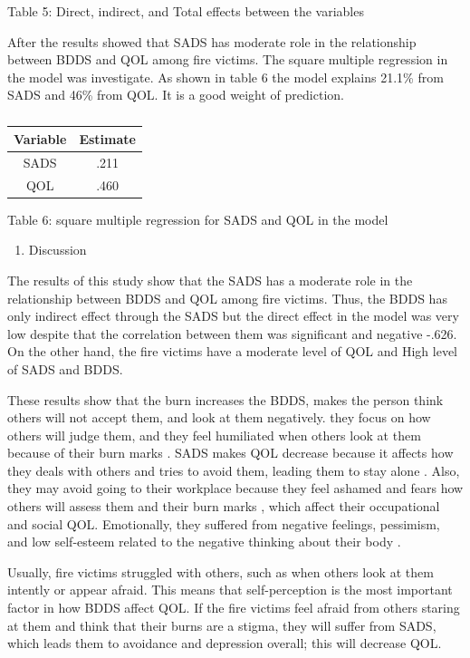 \documentclass[10pt]{NSP1}
\begin{document}
Table 5: Direct, indirect, and Total effects between the variables

After the results showed that SADS has moderate role in the relationship between BDDS and QOL among fire victims. The square multiple regression in the model was investigate. As shown in table 6 the model explains 21.1\% from SADS and 46\% from QOL. It is a good weight of prediction.

\begin{table}[htbp]
\centering
\begin{tabular}{cc}
\hline
Variable & Estimate \\
\hline
SADS & .211 \\
QOL & .460 \\
\hline
\end{tabular}
\caption{}

\end{table}

Table 6: square multiple regression for SADS and QOL in the model

\begin{enumerate}
  \item Discussion
\end{enumerate}

The results of this study show that the SADS has a moderate role in the relationship between BDDS and QOL among fire victims. Thus, the BDDS has only indirect effect through the SADS but the direct effect in the model was very low despite that the correlation between them was significant and negative -.626. On the other hand, the fire victims have a moderate level of QOL and High level of SADS and BDDS.

These results show that the burn increases the BDDS, makes the person think others will not accept them, and look at them negatively. they focus on how others will judge them, and they feel humiliated when others look at them because of their burn marks . SADS makes QOL decrease because it affects how they deals with others and tries to avoid them, leading them to stay alone . Also, they may avoid going to their workplace because they feel ashamed and fears how others will assess them and their burn marks , which affect their occupational and social QOL. Emotionally, they suffered from negative feelings, pessimism, and low self-esteem related to the negative thinking about their body .

Usually, fire victims struggled with others, such as when others look at them intently or appear afraid. This means that self-perception is the most important factor in how BDDS affect QOL. If the fire victims feel afraid from others staring at them and think that their burns are a stigma, they will suffer from SADS, which leads them to avoidance and depression overall; this will decrease QOL.
\end{document}
